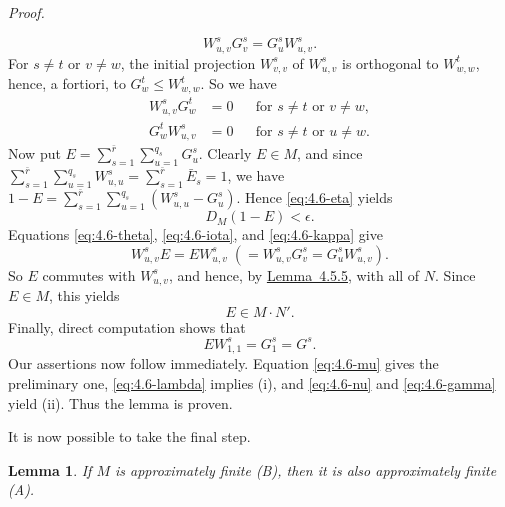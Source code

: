\documentclass[b5paper,twoside]{article}
\newcommand{\lemref}[2]{\hyperref[#1]{\mbox{Lemma~#2}}}
\theoremstyle{mvnplain}
\newtheorem{lemma}{Lemma}[section]
\renewenvironment{proof}[1][Proof]{%
  \par\addvspace{0.35\baselineskip}%
  \noindent\textit{#1.}\ \normalfont\ignorespaces
}{%
  \par\addvspace{0.35\baselineskip}%
}
\newcommand{\M}{\mathbf M}
\newcommand{\N}{\mathbf N}
\def\M{M}%
\def\N{N}%
\begin{document}
\begin{proof}
\begin{equation}
 W^s_{u,v}G^s_v=G^s_uW^s_{u,v}.
\end{equation}
For \(s\ne t\) or \(v\ne w\), the initial projection \(W^s_{v,v}\) of
\(W^s_{u,v}\) is orthogonal to \(W^t_{w,w}\), hence, a fortiori, to
\(G^t_w\leq W^t_{w,w}\). So we have
\begin{align}
 W^s_{u,v}G^t_w&=0 &&\text{for }s\ne t\text{ or }v\ne w,
   \tag{4.6.\(\iota\)}\label{eq:4.6-iota}\\
 G^t_wW^s_{u,v}&=0 &&\text{for }s\ne t\text{ or }u\ne w.
   \tag{4.6.\(\kappa\)}\label{eq:4.6-kappa}
\end{align}
Now put \(E=\sum_{s=1}^{\bar r}\sum_{u=1}^{q_s}G^s_u\). Clearly
\(E\in\M\), and since
\(\sum_{s=1}^{\bar r}\sum_{u=1}^{q_s}W^s_{u,u}=
\sum_{s=1}^{\bar r}\bar E_s=1\), we have
\(1-E=\sum_{s=1}^{\bar r}\sum_{u=1}^{q_s}(W^s_{u,u}-G^s_u)\). Hence
\eqref{eq:4.6-eta} yields
\begin{equation}\tag{4.6.\(\lambda\)}\label{eq:4.6-lambda}
 D_{\M}(1-E)<\epsilon.
\end{equation}
Equations \eqref{eq:4.6-theta}, \eqref{eq:4.6-iota}, and
\eqref{eq:4.6-kappa} give
\[
 W^s_{u,v}E=EW^s_{u,v}
  \;(=W^s_{u,v}G^s_v=G^s_uW^s_{u,v}).
\]
So \(E\) commutes with \(W^s_{u,v}\), and hence, by
\lemref{lem:4.5.5}{4.5.5}, with all of \(\N\). Since \(E\in\M\), this yields
\begin{equation}\tag{4.6.\(\mu\)}\label{eq:4.6-mu}
 E\in\M\mathbin{\cdot}\N'.
\end{equation}
Finally, direct computation shows that
\begin{equation}\tag{4.6.\(\nu\)}\label{eq:4.6-nu}
 EW^s_{1,1}=G^s_1=G^s.
\end{equation}
Our assertions now follow immediately. Equation \eqref{eq:4.6-mu} gives the
preliminary one, \eqref{eq:4.6-lambda} implies (i), and
\eqref{eq:4.6-nu} and \eqref{eq:4.6-gamma} yield (ii). Thus the lemma is
proven.
\end{proof}

It is now possible to take the final step.

\begin{lemma}\label{lem:4.6.2}
If \(\M\) is approximately finite (B), then it is also approximately finite (A).
\end{lemma}
\end{document}
